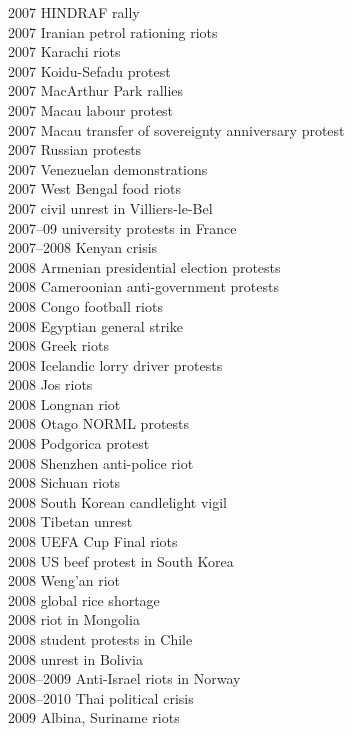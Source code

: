 2007 HINDRAF rally\\
2007 Iranian petrol rationing riots\\
2007 Karachi riots\\
2007 Koidu-Sefadu protest\\
2007 MacArthur Park rallies\\
2007 Macau labour protest\\
2007 Macau transfer of sovereignty anniversary protest\\
2007 Russian protests\\
2007 Venezuelan demonstrations\\
2007 West Bengal food riots\\
2007 civil unrest in Villiers-le-Bel\\
2007–09 university protests in France\\
2007–2008 Kenyan crisis\\
2008 Armenian presidential election protests\\
2008 Cameroonian anti-government protests\\
2008 Congo football riots\\
2008 Egyptian general strike\\
2008 Greek riots\\
2008 Icelandic lorry driver protests\\
2008 Jos riots\\
2008 Longnan riot\\
2008 Otago NORML protests\\
2008 Podgorica protest\\
2008 Shenzhen anti-police riot\\
2008 Sichuan riots\\
2008 South Korean candlelight vigil\\
2008 Tibetan unrest\\
2008 UEFA Cup Final riots\\
2008 US beef protest in South Korea\\
2008 Weng'an riot\\
2008 global rice shortage\\
2008 riot in Mongolia\\
2008 student protests in Chile\\
2008 unrest in Bolivia\\
2008–2009 Anti-Israel riots in Norway\\
2008–2010 Thai political crisis\\
2009 Albina, Suriname riots\\

